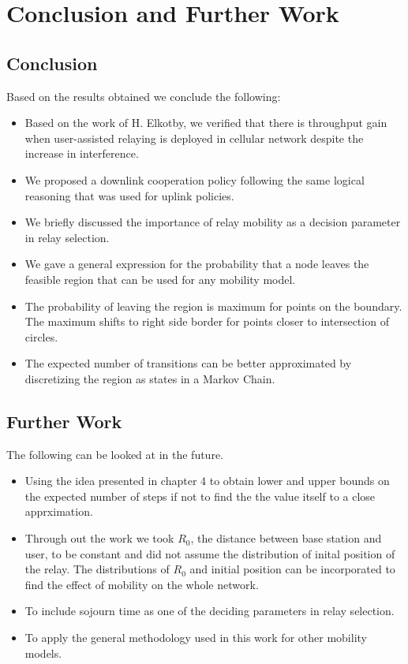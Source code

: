 \chapter{Conclusion and Further Work}
\section{Conclusion}
Based on the results obtained we conclude the following:
\begin{itemize}
\item Based on the work of H. Elkotby, we verified that there is throughput gain when user-assisted relaying is deployed in cellular network despite the increase in interference. 
\item We proposed a downlink cooperation policy following the same logical reasoning that was used for uplink policies.
\item We briefly discussed the importance of relay mobility as a decision parameter in relay selection.
\item We gave a general expression for the probability that a node leaves the feasible region that can be used for any mobility model. 
\item The probability of leaving the region is maximum for points on the boundary. The maximum shifts to right side border for points closer to intersection of circles.
\item The expected number of transitions can be better approximated by discretizing the region as states in a Markov Chain.
\end{itemize}

\section{Further Work}
The following can be looked at in the future.
\begin{itemize}
\item	Using the idea presented in chapter 4 to obtain lower and upper bounds on the expected number of steps if not to find the the value itself to a close apprximation.
\item	Through out the work we took $R_0$, the distance between base station and user, to be constant and did not assume the distribution of inital position of the relay. The distributions of $R_0$ and initial position can be incorporated to find the effect of mobility on the whole network.
\item	To include sojourn time as one of the deciding parameters in relay selection.     
\item	To apply the general methodology used in this work for other mobility models. 
\end{itemize}

